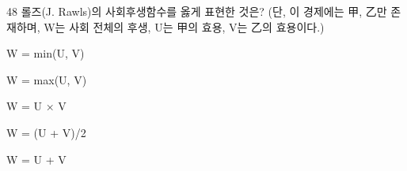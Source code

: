\begin{question}{48}
롤즈(J. Rawls)의 사회후생함수를 옳게 표현한 것은? (단, 이 경제에는 甲, 乙만 존재하며, W는 사회 전체의 후생, U는 甲의 효용, V는 乙의 효용이다.)
\begin{choices}
  \item W = min(U, V)
  \item W = max(U, V)
  \item W = U × V
  \item W = (U + V)/2
  \item W = U + V
\end{choices}
\end{question}
